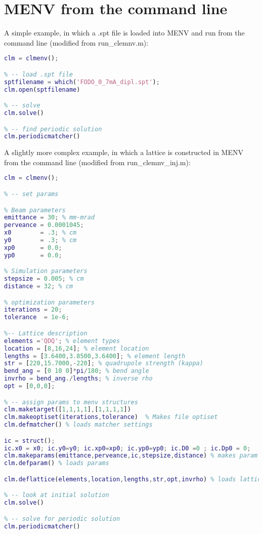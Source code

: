 \documentclass[../menv_main.tex]{subfiles}
\begin{document}
\section{MENV from the command line}

A simple example, in which a .spt file is loaded into MENV and run from the command line (modified from run\_clemnv.m):

\begin{lstlisting}[language=Matlab]
% -- initiate clmenv instance
clm = clmenv();

% -- load .spt file
sptfilename = which('FODO_0_7mA_dipl.spt');
clm.open(sptfilename)

% -- solve
clm.solve()

% -- find periodic solution
clm.periodicmatcher()
\end{lstlisting}


A slightly more complex example, in which a lattice is constructed in MENV from the command line (modified from run\_clemnv\_inj.m):


\begin{lstlisting}[language=Matlab]
clm = clmenv();

% -- set params 

% Beam parameters
emittance = 30; % mm-mrad
perveance = 0.0001045;
x0        = .3; % cm
y0        = .3; % cm
xp0       = 0.0;
yp0       = 0.0;

% Simulation parameters
stepsize = 0.005; % cm
distance = 32; % cm

% optimization parameters
iterations = 20;
tolerance  = 1e-6; 

%-- Lattice description
elements ='QDQ'; % element types
location = [8,16,24]; % element location
lengths = [3.6400,3.8500,3.6400]; % element length
str = [220,15.7000,-220]; % quadrupole strength (kappa)
bend_ang = [0 10 0]*pi/180; % bend angle
invrho = bend_ang./lengths; % inverse rho
opt = [0,0,0];

% -- assign params to menv structures
clm.maketarget([1,1,1,1],[1,1,1,1])
clm.makeoptiset(iterations,tolerance)  % Makes file optiset
clm.defmatcher() % loads matcher settings

ic = struct();
ic.x0 = x0; ic.y0=y0; ic.xp0=xp0; ic.yp0=yp0; ic.D0 =0 ; ic.Dp0 = 0;
clm.makeparams(emittance,perveance,ic,stepsize,distance) % makes param file
clm.defparam() % loads params

clm.deflattice(elements,location,lengths,str,opt,invrho) % loads lattice

% -- look at initial solution
clm.solve()

% -- solve for periodic solution
clm.periodicmatcher()


\end{lstlisting}
\end{document}
